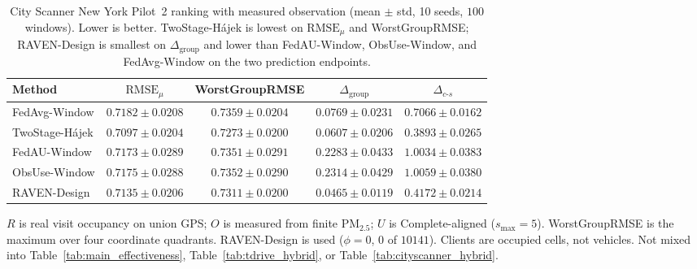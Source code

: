 \begin{table}[t]
\centering
\caption{City Scanner New York Pilot~2 ranking with measured observation
(mean $\pm$ std, 10 seeds, $100$ windows).  Lower is better.
TwoStage-H\'ajek is lowest on $\mathrm{RMSE}_{\mu}$ and WorstGroupRMSE;
RAVEN-Design is smallest on $\Delta_{\mathrm{group}}$ and
lower than FedAU-Window, ObsUse-Window, and FedAvg-Window on the two prediction
endpoints.}
\label{tab:cityscanner_p2_measured_o}
\scriptsize
\setlength{\tabcolsep}{2.5pt}
\begin{tabular}{@{}lcccc@{}}
\toprule
Method & $\mathrm{RMSE}_{\mu}$ & WorstGroupRMSE &
$\Delta_{\mathrm{group}}$ & $\Delta_{c\text{-}s}$\\
\midrule
FedAvg-Window & $0.7182{\pm}0.0208$ & $0.7359{\pm}0.0204$ & $0.0769{\pm}0.0231$ & $0.7066{\pm}0.0162$\\
TwoStage-H\'ajek & $\mathbf{0.7097}{\pm}0.0204$ & $\mathbf{0.7273}{\pm}0.0200$ & $0.0607{\pm}0.0206$ & $\mathbf{0.3893}{\pm}0.0265$\\
FedAU-Window & $0.7173{\pm}0.0289$ & $0.7351{\pm}0.0291$ & $0.2283{\pm}0.0433$ & $1.0034{\pm}0.0383$\\
ObsUse-Window & $0.7175{\pm}0.0288$ & $0.7352{\pm}0.0290$ & $0.2314{\pm}0.0429$ & $1.0059{\pm}0.0380$\\
RAVEN-Design & $0.7135{\pm}0.0206$ & $0.7311{\pm}0.0200$ & $\mathbf{0.0465}{\pm}0.0119$ & $0.4172{\pm}0.0214$\\
\bottomrule
\end{tabular}

\begin{minipage}{\columnwidth}
\raggedright\scriptsize
$R$ is real visit occupancy on union GPS; $O$ is measured from finite
{PM}$_{2.5}$; $U$ is Complete-aligned ($s_{\max}=5$).
WorstGroupRMSE is the maximum over four coordinate quadrants.
RAVEN-Design is used ($\phi=0$, $0$ of $10141$).
Clients are occupied cells, not vehicles.
Not mixed into Table~\ref{tab:main_effectiveness},
Table~\ref{tab:tdrive_hybrid}, or Table~\ref{tab:cityscanner_hybrid}.
\end{minipage}
\end{table}


